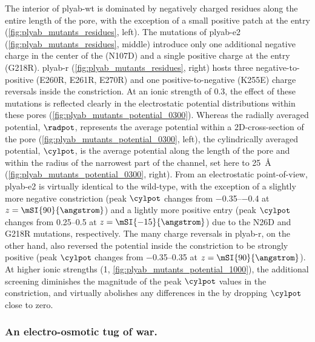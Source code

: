 The interior of \gls{plyab-wt} is dominated by negatively charged residues along the entire length of the
pore, with the exception of a small positive patch at the \transi{} entry (\cref{fig:plyab_mutants_residues},
left). The mutations of \gls{plyab-e2} (\cref{fig:plyab_mutants_residues}, middle) introduce only one
additional negative charge in the center of the \transi{} \lumen{} (N107D) and a single positive charge at the
\transi{} entry (G218R). \Gls{plyab-r} (\cref{fig:plyab_mutants_residues}, right) hosts three
negative-to-positive (E260R, E261R, E270R) and one positive-to-negative (K255E) charge reversals inside the
\cisi{} constriction. At an ionic strength of \SI{0.3}{\Molar}, the effect of these mutations is reflected
clearly in the electrostatic potential distributions within these pores
(\cref{fig:plyab_mutants_potential_0300}). Whereas the radially averaged potential, $\radpot$, represents the
average potential within a 2D-cross-section of the pore (\cref{fig:plyab_mutants_potential_0300}, left), the
cylindrically averaged potential, $\cylpot$, is the average potential along the length of the pore and within
the radius of the narrowest part of the channel, set here to \SI{25}{\angstrom}
(\cref{fig:plyab_mutants_potential_0300}, right). From an electrostatic point-of-view, \gls{plyab-e2} is
virtually identical to the wild-type, with the exception of a slightly more negative constriction (peak
$\cylpot$ changes from \SIrange{-0.35}{-0.4}{\kTe} at $z = \mSI{90}{\angstrom}$) and a lightly more positive
\transi{} entry (peak $\cylpot$ changes from \SIrange{+0.25}{+0.5}{\kTe} at $z = \mSI{-15}{\angstrom}$) due to
the N26D and G218R mutations, respectively. The many charge reversals in \gls{plyab-r}, on the other hand,
also reversed the potential inside the constriction to be strongly positive (peak $\cylpot$ changes from
\SIrange{-0.35}{+0.35}{\kTe} at $z = \mSI{90}{\angstrom}$). At higher ionic strengths (\SI{1}{\Molar},
\cref{fig:plyab_mutants_potential_1000}), the additional screening diminishes the magnitude of the peak
$\cylpot$ values in the constriction, and virtually abolishes any differences in the \transi{} \lumen{} by
dropping $\cylpot$ close to zero.

\subsubsection{An electro-osmotic tug of war.}
%

